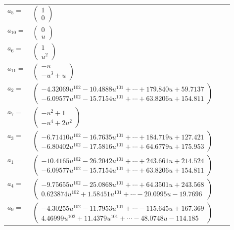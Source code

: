 \documentclass[1p]{elsarticle_modified}
\theoremstyle{definition}
\begin{document}
\begin{tabular}{m{7pt} m{180pt} m{7pt} m{180pt} }
\flushright $a_{5}=$&$\begin{pmatrix}1\\0\end{pmatrix}$ \\
\flushright $a_{10}=$&$\begin{pmatrix}0\\u\end{pmatrix}$ \\
\flushright $a_{6}=$&$\begin{pmatrix}1\\u^2\end{pmatrix}$ \\
\flushright $a_{11}=$&$\begin{pmatrix}- u\\- u^3+u\end{pmatrix}$ \\
\flushright $a_{2}=$&$\begin{pmatrix}-4.32069 u^{102}-10.4888 u^{101}+\cdots+179.840 u+59.7137\\-6.09577 u^{102}-15.7154 u^{101}+\cdots+63.8206 u+154.811\end{pmatrix}$ \\
\flushright $a_{7}=$&$\begin{pmatrix}- u^2+1\\- u^4+2 u^2\end{pmatrix}$ \\
\flushright $a_{3}=$&$\begin{pmatrix}-6.71410 u^{102}-16.7635 u^{101}+\cdots+184.719 u+127.421\\-6.80402 u^{102}-17.5816 u^{101}+\cdots+64.6779 u+175.953\end{pmatrix}$ \\
\flushright $a_{1}=$&$\begin{pmatrix}-10.4165 u^{102}-26.2042 u^{101}+\cdots+243.661 u+214.524\\-6.09577 u^{102}-15.7154 u^{101}+\cdots+63.8206 u+154.811\end{pmatrix}$ \\
\flushright $a_{4}=$&$\begin{pmatrix}-9.75655 u^{102}-25.0868 u^{101}+\cdots+64.3501 u+243.568\\0.623874 u^{102}+1.58451 u^{101}+\cdots-20.0995 u-19.7696\end{pmatrix}$ \\
\flushright $a_{9}=$&$\begin{pmatrix}-4.30255 u^{102}-11.7953 u^{101}+\cdots-115.645 u+167.369\\4.46999 u^{102}+11.4379 u^{101}+\cdots-48.0748 u-114.185\end{pmatrix}$ \\

\end{tabular}
\end{document}
